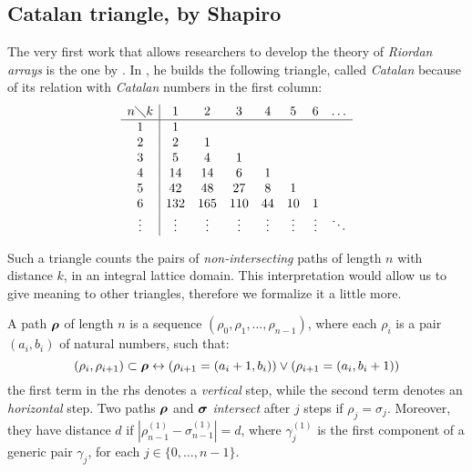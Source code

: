 
\subsection{Catalan triangle, by Shapiro}

The very first work that allows researchers to develop the theory of
\emph{Riordan arrays} is the one by \citeauthor{shapiro:1976}. 
In \cite{shapiro:1976}, he builds the following triangle, called
\emph{Catalan} because of its relation with \emph{Catalan} numbers in the first
column:
\begin{equation}
    \begin{array}{c|ccccccc}
        n\diagdown k & 1 & 2 & 3 & 4 & 5 & 6&\ldots\\
        \hline
        1&1 & & & & & &\\
        2&2 &1 & & & & &\\
        3&5 &4 &1 & & & &\\
        4&14 &14 &6 &1 & & &\\
        5&42 &48 &27 &8 &1 & &\\
        6&132 &165 &110 &44 &10 &1& \\
        \vdots&\vdots&\vdots&\vdots&\vdots&\vdots&\vdots&\ddots \\
    \end{array}
    \label{eq:shapiro:catalan:triangle:expanded}
\end{equation}

Such a triangle counts the pairs of \emph{non-intersecting} paths of length $n$
with distance $k$, in an integral lattice domain. This interpretation would
allow us to give meaning to other triangles, 
therefore we formalize it a little more.

A path $\boldsymbol{\rho}$ of length $n$ is a sequence $(\rho_{0},\rho_{1},\ldots,\rho_{n-1})$,
where each $\rho_{i}$ is a pair $(a_{i},b_{i})$ of natural numbers, such that:
\begin{displaymath}
    (\rho_{i},\rho_{i+1})\subset\boldsymbol{\rho} \leftrightarrow
    (\rho_{i+1}=(a_{i}+1,b_{i})) \vee 
    (\rho_{i+1}=(a_{i},b_{i}+1)) 
\end{displaymath}
the first term in the \ac{rhs} denotes a \emph{vertical} step, while the second
term denotes an \emph{horizontal} step. Two paths $\boldsymbol{\rho}$ and
$\boldsymbol{\sigma}$ \emph{intersect} after $j$ steps if $\rho_{j}=\sigma_{j}$.
Moreover, they have distance $d$ if
$\left|\rho_{n-1}^{(1)}-\sigma_{n-1}^{(1)}\right|=d$, where $\gamma_{j}^{(1)}$
is the first component of a generic pair $\gamma_{j}$, for each
$j\in\lbrace0,\ldots,n-1\rbrace$.

